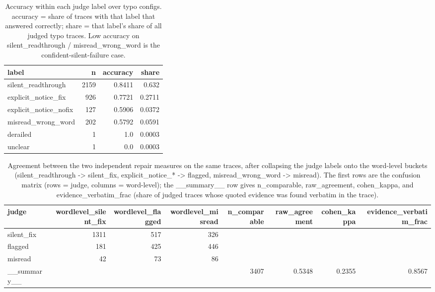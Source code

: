 \documentclass[11pt]{article}
\begin{document}
\begin{table}[H]
\centering
\caption{Accuracy within each judge label over typo configs. accuracy = share of traces with that label that answered correctly; share = that label's share of all judged typo traces. Low accuracy on silent\_readthrough / misread\_wrong\_word is the confident-silent-failure case.}
\small
\begin{adjustbox}{max width=\textwidth}
\begin{tabular}{lrrr}
\toprule
\textbf{label} & \textbf{n} & \textbf{accuracy} & \textbf{share} \\
\midrule
silent\_readthrough & 2159 & 0.8411 & 0.632 \\
explicit\_notice\_fix & 926 & 0.7721 & 0.2711 \\
explicit\_notice\_nofix & 127 & 0.5906 & 0.0372 \\
misread\_wrong\_word & 202 & 0.5792 & 0.0591 \\
derailed & 1 & 1.0 & 0.0003 \\
unclear & 1 & 0.0 & 0.0003 \\
\bottomrule
\end{tabular}
\end{adjustbox}
\end{table}

\begin{table}[H]
\centering
\caption{Agreement between the two independent repair measures on the same traces, after collapsing the judge labels onto the word-level buckets (silent\_readthrough -> silent\_fix, explicit\_notice\_* -> flagged, misread\_wrong\_word -> misread). The first rows are the confusion matrix (rows = judge, columns = word-level); the \_\_summary\_\_ row gives n\_comparable, raw\_agreement, cohen\_kappa, and evidence\_verbatim\_frac (share of judged traces whose quoted evidence was found verbatim in the trace).}
\small
\begin{adjustbox}{max width=\textwidth}
\begin{tabular}{lrrrrrrr}
\toprule
\textbf{judge} & \textbf{wordlevel\_silent\_fix} & \textbf{wordlevel\_flagged} & \textbf{wordlevel\_misread} & \textbf{n\_comparable} & \textbf{raw\_agreement} & \textbf{cohen\_kappa} & \textbf{evidence\_verbatim\_frac} \\
\midrule
silent\_fix & 1311 & 517 & 326 &  &  &  &  \\
flagged & 181 & 425 & 446 &  &  &  &  \\
misread & 42 & 73 & 86 &  &  &  &  \\
\_\_summary\_\_ &  &  &  & 3407 & 0.5348 & 0.2355 & 0.8567 \\
\bottomrule
\end{tabular}
\end{adjustbox}
\end{table}
\end{document}
